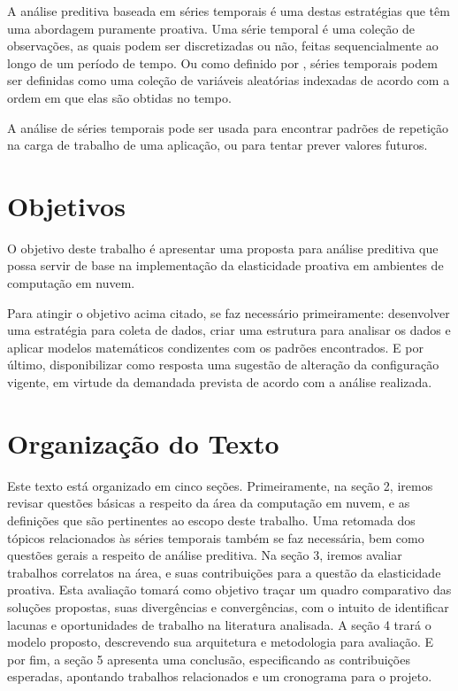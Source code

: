 \documentclass[twoside,english,brazilian]{UNISINOSmonografia}
\begin{document}
A análise preditiva baseada em séries temporais é uma destas estratégias que têm uma abordagem puramente proativa. Uma série temporal é uma coleção de observações, as quais podem ser discretizadas ou não, feitas sequencialmente ao longo de um período de tempo. Ou como definido por \cite{shumway2000time}, séries temporais podem ser definidas como uma coleção de variáveis aleatórias indexadas de acordo com a ordem em que elas são obtidas no tempo. 

A análise de séries temporais pode ser usada para encontrar padrões de repetição na carga de trabalho de uma aplicação, ou para tentar prever valores futuros. 

\section{Objetivos}
O objetivo deste trabalho é apresentar uma proposta para análise preditiva que possa servir de base na implementação da elasticidade proativa em ambientes de computação em nuvem.

Para atingir o objetivo acima citado, se faz necessário primeiramente: desenvolver uma estratégia para coleta de dados, criar uma estrutura para analisar os dados e aplicar modelos matemáticos condizentes com os padrões encontrados. E por último, disponibilizar como resposta uma sugestão de alteração da configuração vigente, em virtude da demandada prevista de acordo com a análise realizada. 

\section{Organização do Texto}
Este texto está organizado em cinco seções. Primeiramente, na seção 2, iremos revisar questões básicas a respeito da área da computação em nuvem, e as definições que são pertinentes ao escopo deste trabalho. Uma retomada dos tópicos relacionados às séries temporais também se faz necessária, bem como questões gerais a respeito de análise preditiva. Na seção 3, iremos avaliar trabalhos correlatos na área, e suas contribuições para a questão da elasticidade proativa. Esta avaliação tomará como objetivo traçar um quadro comparativo das soluções propostas, suas divergências e convergências, com o intuito de identificar lacunas e oportunidades de trabalho na literatura analisada. A seção 4 trará o modelo proposto, descrevendo sua arquitetura e metodologia para avaliação. E por fim, a seção 5 apresenta uma conclusão, especificando as contribuições esperadas, apontando trabalhos relacionados e um cronograma para o projeto.
\end{document}
